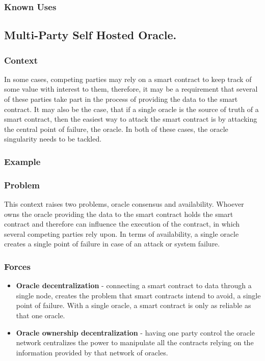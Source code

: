 \subsubsection{Known Uses}

\subsection{Multi-Party Self Hosted Oracle.}

\subsubsection{Context}
In some cases, competing parties may rely on a smart contract to keep track of some value with interest to them, therefore, it may be a requirement that several of these parties take part in the process of providing the data to the smart contract. It may also be the case, that if a single oracle is the source of truth of a smart contract, then the easiest way to attack the smart contract is by attacking the central point of failure, the oracle. In both of these cases, the oracle singularity needs to be tackled.

\subsubsection{Example}

\subsubsection{Problem}
This context raises two problems, oracle consensus and availability. Whoever owns the oracle providing the data to the smart contract holds the smart contract and therefore can influence the execution of the contract, in which several competing parties rely upon. In terms of availability, a single oracle creates a single point of failure in case of an attack or system failure.

\subsubsection{Forces}
\begin{itemize}
  \item \textbf{Oracle decentralization} - connecting a smart contract to data through a single node, creates the problem that smart contracts intend to avoid, a single point of failure. With a single oracle, a smart contract is only as reliable as that one oracle.
  \item \textbf{Oracle ownership decentralization} - having one party control the oracle network centralizes the power to manipulate all the contracts relying on the information provided by that network of oracles.
\end{itemize}

